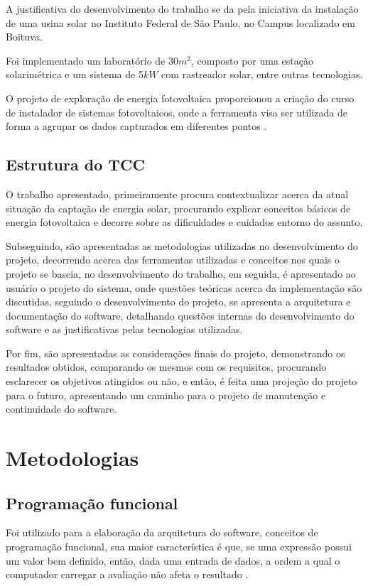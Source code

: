 A justificativa do desenvolvimento do trabalho se da pela iniciativa da instalação de uma usina solar no Instituto Federal de São Paulo, no Campus localizado em Boituva.

Foi implementado um laboratório de 30$m^2$, composto por uma estação solarimétrica e um sistema de 5$kW$ com rastreador solar, entre outras tecnologias.

O projeto de exploração de energia fotovoltaica proporcionou a criação do curso de instalador de sistemas fotovoltaicos, onde a ferramenta visa ser utilizada de forma a agrupar os dados capturados em diferentes pontos \cite{solar_ifsp_btv}.

\section{Estrutura do TCC}

O trabalho apresentado, primeiramente procura contextualizar acerca da atual situação da captação de energia solar, procurando explicar conceitos básicos de energia fotovoltaica e decorre sobre as dificuldades e cuidados entorno do assunto.

Subseguindo, são apresentadas as metodologias utilizadas no desenvolvimento do projeto, decorrendo acerca das ferramentas utilizadas e conceitos nos quais o projeto se baseia, no desenvolvimento do trabalho, em seguida, é apresentado ao usuário o projeto do sistema, onde questões teóricas acerca da implementação são discutidas, seguindo o desenvolvimento do projeto, se apresenta a arquitetura e documentação do software, detalhando questões internas do desenvolvimento do software e as justificativas pelas tecnologias utilizadas.

Por fim, são apresentadas as considerações finais do projeto, demonstrando os resultados obtidos, comparando os mesmos com os requisitos, procurando esclarecer os objetivos atingidos ou não, e então, é feita uma projeção do projeto para o futuro, apresentando um caminho para o projeto de manutenção e continuidade do software.

\chapter{Metodologias}

\section{Programação funcional}

Foi utilizado para a elaboração da arquitetura do software, conceitos de programação funcional, sua maior característica é que, se uma expressão possui um valor bem definido, então, dada uma entrada de dados, a ordem a qual o computador carregar a avaliação não afeta o resultado \cite{introduction_functional}.

